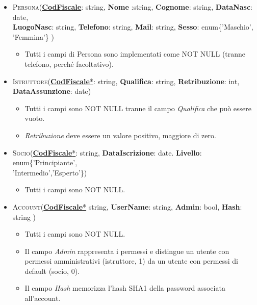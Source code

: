 \begin{itemize}
\item \textsc{Persona}(\underline{\textbf{CodFiscale}}: string, \textbf{Nome} :string, \textbf{Cognome}: string, \textbf{DataNasc}: date,\\ \textbf{LuogoNasc}: string, \textbf{Telefono}: string,  \textbf{Mail}: string, \textbf{Sesso}: enum\{'Maschio', 'Femmina'\} ) 
\begin{itemize}
\item Tutti i campi di Persona sono implementati come NOT NULL (tranne telefono, perché facoltativo).
\end{itemize}

\item \textsc{Istruttore}(\underline{\textbf{CodFiscale}*}: string, \textbf{Qualifica}: string, \textbf{Retribuzione}: int, \textbf{DataAssunzione}: date)
\begin{itemize}
\item Tutti i campi sono NOT NULL tranne il campo \textit{Qualifica} che può essere vuoto.
\item \textit{Retribuzione} deve essere un valore positivo, maggiore di zero.
\end{itemize}

\item \textsc{Socio}(\underline{\textbf{CodFiscale}*}: string, \textbf{DataIscrizione}: date. \textbf{Livello}: enum\{'Principiante',\\'Intermedio','Esperto'\})  
\begin{itemize}
\item Tutti i campi sono NOT NULL.
\end{itemize}

\item \textsc{Account}(\underline{\textbf{CodFiscale}*} string, \textbf{UserName}: string, \textbf{Admin}: bool, \textbf{Hash}: string )
\begin{itemize}
\item Tutti i campi sono NOT NULL.
\item Il campo \textit{Admin} rappresenta i permessi e distingue un utente con permessi amministrativi (istruttore, 1) da un utente con permessi di default (socio, 0).
\item Il campo \textit{Hash} memorizza l'hash SHA1 della password associata all'account.
\end{itemize}


\end{itemize}
